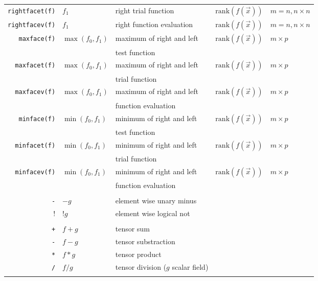 \begin{longtable}[c]{rllll}
  \lstinline!rightfacet(f)! & $f_1$ & right  trial function & $\mathrm{rank}( f(\overrightarrow{x}))$   & $m=n, n\times n$\\
  \lstinline!rightfacev(f)! & $f_1$ & right   function evaluation & $\mathrm{rank}( f(\overrightarrow{x}))$   & $m=n, n\times n$\\

  \lstinline!maxface(f)! & $\max(f_0,f_1)$ & maximum of right and left & $\mathrm{rank}( f(\overrightarrow{x}))$   & $m\times p$\\
  && test   function&&\\
  \lstinline!maxfacet(f)! & $\max(f_0,f_1)$ & maximum of right and left & $\mathrm{rank}( f(\overrightarrow{x}))$   & $m\times p$\\
  && trial   function&&\\
  \lstinline!maxfacev(f)! & $\max(f_0,f_1)$ & maximum of right and left & $\mathrm{rank}( f(\overrightarrow{x}))$   & $m\times p$\\
  && function evaluation&&\\
  \lstinline!minface(f)! & $\min(f_0,f_1)$ & minimum of right and left & $\mathrm{rank}( f(\overrightarrow{x}))$   & $m\times p$\\
  && test   function&&\\
  \lstinline!minfacet(f)! & $\min(f_0,f_1)$ & minimum of right and left & $\mathrm{rank}( f(\overrightarrow{x}))$   & $m\times p$\\
  && trial   function&&\\
  \lstinline!minfacev(f)! & $\min(f_0,f_1)$ & minimum of right and left & $\mathrm{rank}( f(\overrightarrow{x}))$   & $m\times p$\\
  && function evaluation&&\\
  \hline\\
  \lstinline!-! & $-g$ & element wise unary minus  & & \\
  \lstinline!!! & $!g$ & element wise logical not  & & \\\hline\\

  \lstinline!+! & $f+g$ & tensor sum  & & \\
  \lstinline!-! & $f-g$ & tensor substraction  & & \\
  \lstinline!*! & $f*g$ & tensor product  & & \\
  \lstinline!/! & $f/g$ & tensor division ($g$ scalar field)  & & \\\hline\\


\end{longtable}
